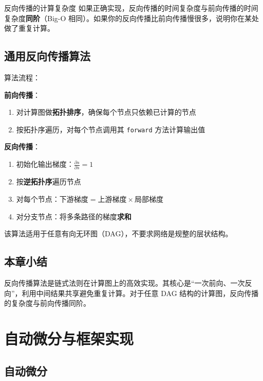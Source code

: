 \documentclass[a4paper]{article}
\begin{document}
\begin{importantbox}{反向传播的计算复杂度}
如果正确实现，反向传播的时间复杂度与前向传播的时间复杂度\textbf{同阶}（Big-O 相同）。如果你的反向传播比前向传播慢很多，说明你在某处做了重复计算。
\end{importantbox}

\subsection{通用反向传播算法}





算法流程：

\textbf{前向传播}：
\begin{enumerate}
    \item 对计算图做\textbf{拓扑排序}，确保每个节点只依赖已计算的节点
    \item 按拓扑序遍历，对每个节点调用其 \texttt{forward} 方法计算输出值
\end{enumerate}

\textbf{反向传播}：
\begin{enumerate}
    \item 初始化输出梯度：$\frac{\partial s}{\partial s} = 1$
    \item 按\textbf{逆拓扑序}遍历节点
    \item 对每个节点：$\text{下游梯度} = \text{上游梯度} \times \text{局部梯度}$
    \item 对分支节点：将多条路径的梯度\textbf{求和}
\end{enumerate}

该算法适用于任意有向无环图（DAG），不要求网络是规整的层状结构。

\subsection{本章小结}

反向传播算法是链式法则在计算图上的高效实现。其核心是``一次前向、一次反向''，利用中间结果共享避免重复计算。对于任意 DAG 结构的计算图，反向传播的复杂度与前向传播同阶。


\section{自动微分与框架实现}

\subsection{自动微分}
\end{document}
